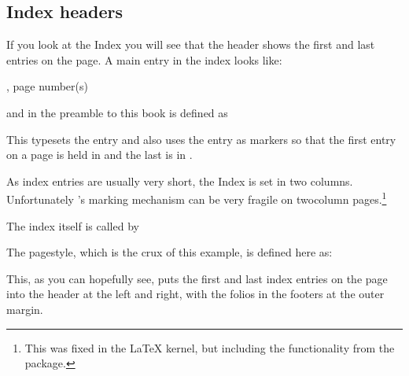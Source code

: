 


\subsection{Index headers}


    If you look at the Index you will see that the header 
shows the first and last entries on the page.
A main entry in the index looks like:
\begin{lcode}
\item {}, page number(s)
\end{lcode}
and in the preamble to this book \cmd{\idxmark} is defined as
\begin{lcode}
\newcommand{\idxmark}[1]{#1\markboth{#1}{#1}}
\end{lcode}
This typesets the entry and also uses the entry as markers so that
the first entry on a page is held in \cmd{\rightmark} and the last
is in \cmd{\leftmark}.

    As index entries are usually very short, the 
Index is set in two columns. 
Unfortunately \ltx's marking mechanism can be very
fragile on twocolumn pages.\footnote{This was
  fixed in the \LaTeX{} kernel, but including the functionality from
  the  package.}

    The index itself is called by
\begin{lcode}
\clearpage
\pagestyle{index}
\renewcommand{\preindexhook}{%
The first page number is usually, but not always, 
the primary reference to
the indexed topic.\vskip\onelineskip}
\printindex
\end{lcode}


    The  pagestyle, which is the crux of
this example, is defined here as:
\begin{lcode}
\end{lcode}
This, as you can hopefully see, puts the first and last index 
entries on the page into the header at the left and right, 
with the folios in the footers at the 
outer margin.

